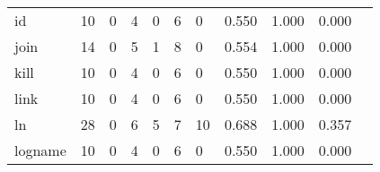 \begin{longtable}{lp{1.2cm}p{1.2cm}p{1.2cm}p{1.2cm}p{1.2cm}p{1.2cm}p{1.2cm}p{1.2cm}p{1.2cm}p{1.2cm}}
id        &                                    10 &                                                  0 &                                                  4 &                                                  0 &                                                  6 &                                                  0 &                                              0.550 &                                              1.000 &                                              0.000 \\
join      &                                    14 &                                                  0 &                                                  5 &                                                  1 &                                                  8 &                                                  0 &                                              0.554 &                                              1.000 &                                              0.000 \\
kill      &                                    10 &                                                  0 &                                                  4 &                                                  0 &                                                  6 &                                                  0 &                                              0.550 &                                              1.000 &                                              0.000 \\
link      &                                    10 &                                                  0 &                                                  4 &                                                  0 &                                                  6 &                                                  0 &                                              0.550 &                                              1.000 &                                              0.000 \\
ln        &                                    28 &                                                  0 &                                                  6 &                                                  5 &                                                  7 &                                                 10 &                                              0.688 &                                              1.000 &                                              0.357 \\
logname   &                                    10 &                                                  0 &                                                  4 &                                                  0 &                                                  6 &                                                  0 &                                              0.550 &                                              1.000 &                                              0.000 \\

\end{longtable}
